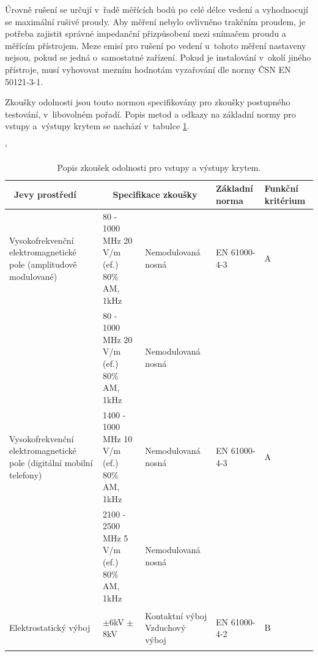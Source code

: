 Úrovně rušení se určují v~řadě měřících bodů po celé délce vedení a vyhodnocují se maximální rušivé proudy. Aby měření nebylo ovlivněno trakčním proudem, je potřeba zajistit správné impedanční přizpůsobení mezi snímačem proudu a měřícím přístrojem. Meze emisí pro rušení po vedení u~tohoto měření nastaveny nejsou, pokud se jedná o~samostatné zařízení. Pokud je instalování v~okolí jiného přístroje, musí vyhovovat mezním hodnotám vyzařování dle normy ČSN EN 50121-3-1.

Zkoušky odolnosti jsou touto normou specifikovány pro zkoušky postupného testování, v~libovolném pořadí. Popis metod a odkazy na základní normy pro vstupy a~výstupy krytem se nachází v~tabulce \ref{tab:emc_odolnosti1}.

\begin{table}[!h]
\catcode`
\begin{center}
  	\caption{Popis zkoušek odolnosti pro vstupy a výstupy krytem.}
  	\label{tab:emc_odolnosti1}
\begin{tabular}{|p{}|p{}|p{}|p{}|p{}|}
	\hline
	{\bf\ Jevy prostředí} 	& \multicolumn{2}{c}{\bf Specifikace zkoušky}\vline & {\bf Základní norma} & {\bf Funkční kritérium} \\
	\hline
	\hline
	Vysokofrekvenční elektromagnetické pole (amplitudově modulované) & 80 - 1000 MHz 20 V/m (ef.) 80\% AM, 1kHz & Nemodulovaná nosná	& \begin{center}EN 61000-4-3 		\end{center}& \begin{center} A~\end{center} \\ 
	\hline
	 & 80 - 1000 MHz 20 V/m (ef.) 80\% AM, 1kHz & Nemodulovaná nosná &   &  \\
	\cline{2-3}
	Vysokofrekvenční elektromagnetické pole (digitální mobilní telefony) & 1400 - 1000 MHz 10 V/m (ef.) 80\% AM, 1kHz & Nemodulovaná nosná & 	\begin{center}  EN 61000-4-3  \end{center} & \begin{center} A~\end{center} \\
	\cline{2-3}
	& 2100 - 2500 MHz 5 V/m (ef.) 80\% AM, 1kHz & Nemodulovaná nosná	&  &  \\
	\hline
	Elektrostatický výboj & \begin{center} $\pm$6kV $\pm$8kV \end{center} & Kontaktní výboj \mbox{Vzduchový} výboj &\begin{center}EN 61000-4-2 \end{center} 
	& \begin{center}B\end{center} \\
	\hline
\end{tabular}
\end{center}
\end{table}

